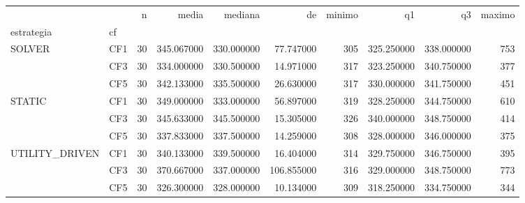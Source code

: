 \begin{tabular}{llrrrrrrrr}
\toprule
 &  & n & media & mediana & de & minimo & q1 & q3 & maximo \\
estrategia & cf &  &  &  &  &  &  &  &  \\
\midrule
\multirow[t]{3}{*}{SOLVER} & CF1 & 30 & 345.067000 & 330.000000 & 77.747000 & 305 & 325.250000 & 338.000000 & 753 \\
 & CF3 & 30 & 334.000000 & 330.500000 & 14.971000 & 317 & 323.250000 & 340.750000 & 377 \\
 & CF5 & 30 & 342.133000 & 335.500000 & 26.630000 & 317 & 330.000000 & 341.750000 & 451 \\
\cline{1-10}
\multirow[t]{3}{*}{STATIC} & CF1 & 30 & 349.000000 & 333.000000 & 56.897000 & 319 & 328.250000 & 344.750000 & 610 \\
 & CF3 & 30 & 345.633000 & 345.500000 & 15.305000 & 326 & 340.000000 & 348.750000 & 414 \\
 & CF5 & 30 & 337.833000 & 337.500000 & 14.259000 & 308 & 328.000000 & 346.000000 & 375 \\
\cline{1-10}
\multirow[t]{3}{*}{UTILITY_DRIVEN} & CF1 & 30 & 340.133000 & 339.500000 & 16.404000 & 314 & 329.750000 & 346.750000 & 395 \\
 & CF3 & 30 & 370.667000 & 337.000000 & 106.855000 & 316 & 329.000000 & 348.750000 & 773 \\
 & CF5 & 30 & 326.300000 & 328.000000 & 10.134000 & 309 & 318.250000 & 334.750000 & 344 \\
\cline{1-10}
\bottomrule
\end{tabular}
